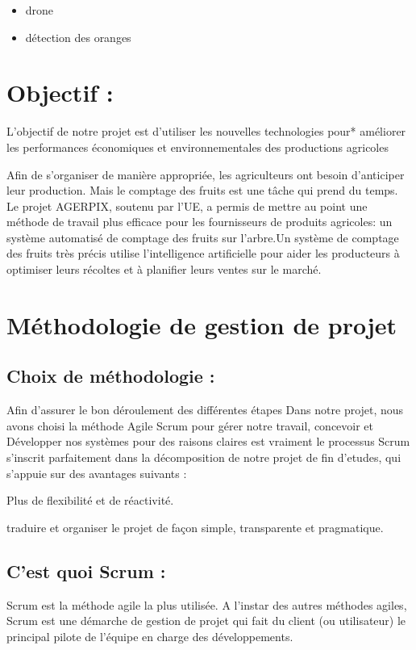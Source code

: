 \begin{itemize}
\item  drone 	
\item détection des oranges
\end{itemize}

	\section{Objectif :}
	L'objectif de notre projet est d’utiliser les nouvelles technologies pour*
	 améliorer les performances économiques et environnementales des productions agricoles
	
	
	
	Afin de s’organiser de manière appropriée, les agriculteurs ont besoin d’anticiper leur production. Mais le comptage des fruits est une tâche qui prend du temps. Le projet AGERPIX, soutenu par l’UE, a permis de mettre au point une méthode de travail plus efficace pour les fournisseurs de produits agricoles: un système automatisé de comptage des fruits sur l’arbre.Un système de comptage des fruits très précis utilise l’intelligence artificielle pour aider les producteurs à optimiser leurs récoltes et à planifier leurs ventes sur le marché.
	
	\section{Méthodologie de gestion de projet }
	\subsection{Choix de méthodologie :}
	Afin d'assurer le bon déroulement des différentes étapes
	Dans notre projet, nous avons choisi la méthode Agile Scrum pour gérer notre travail, concevoir et
	Développer nos systèmes pour des raisons claires est vraiment le processus
	Scrum s'inscrit parfaitement dans la décomposition de notre projet de fin d'etudes, qui s'appuie sur des avantages suivants :
	
	
	Plus de flexibilité et de réactivité.
	
	
	traduire et organiser le projet de façon simple, transparente et pragmatique.
	
	\subsection{C'est quoi Scrum :}
	Scrum est la méthode agile la plus utilisée. A l'instar des autres méthodes agiles, Scrum est une démarche de gestion de projet qui fait du client (ou utilisateur) le principal pilote de l'équipe en charge des développements.
